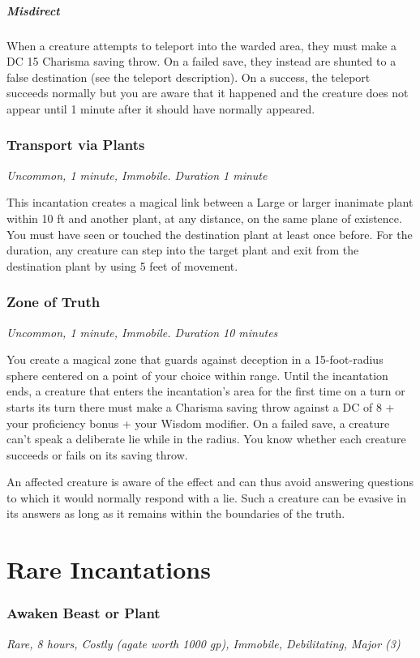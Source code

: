 \subparagraph*{Misdirect} When a creature attempts to teleport into the warded area, they must make a DC 15 Charisma saving throw. On a failed save, they instead are shunted to a false destination (see the teleport description). On a success, the teleport succeeds normally but you are aware that it happened and the creature does not appear until 1 minute after it should have normally appeared.

\subsubsection{Transport via Plants}
\textit{Uncommon, 1 minute, Immobile. Duration 1 minute}

This incantation creates a magical link between a Large or larger inanimate plant within 10 ft and another plant, at any distance, on the same plane of existence. You must have seen or touched the destination plant at least once before. For the duration, any creature can step into the target plant and exit from the destination plant by using 5 feet of movement.

\subsubsection{Zone of Truth}
\textit{Uncommon, 1 minute, Immobile. Duration 10 minutes}

You create a magical zone that guards against deception in a 15-foot-radius sphere centered on a point of your choice within range. Until the incantation ends, a creature that enters the incantation's area for the first time on a turn or starts its turn there must make a Charisma saving throw against a DC of 8 + your proficiency bonus + your Wisdom modifier. On a failed save, a creature can't speak a deliberate lie while in the radius. You know whether each creature succeeds or fails on its saving throw.

An affected creature is aware of the effect and can thus avoid answering questions to which it would normally respond with a lie. Such a creature can be evasive in its answers as long as it remains within the boundaries of the truth.

\section{Rare Incantations}

\subsubsection{Awaken Beast or Plant}
\textit{Rare, 8 hours, Costly (agate worth 1000 gp), Immobile, Debilitating, Major (3)}

